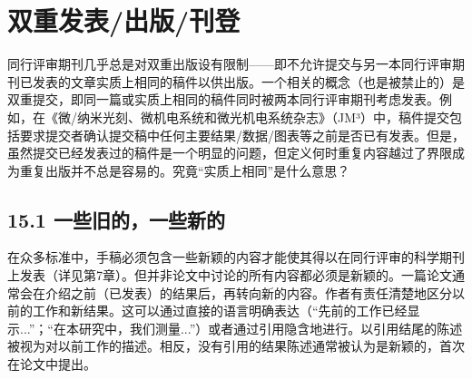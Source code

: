 \section*{双重发表/出版/刊登}
同行评审期刊几乎总是对双重出版设有限制——即不允许提交与另一本同行评审期刊已发表的文章实质上相同的稿件以供出版。一个相关的概念（也是被禁止的）是双重提交，即同一篇或实质上相同的稿件同时被两本同行评审期刊考虑发表。例如，在《微/纳米光刻、微机电系统和微光机电系统杂志》（JM³）中，稿件提交包括要求提交者确认提交稿中任何主要结果/数据/图表等之前是否已有发表。但是，虽然提交已经发表过的稿件是一个明显的问题，但定义何时重复内容越过了界限成为重复出版并不总是容易的。究竟“实质上相同”是什么意思？

\subsection*{15.1 一些旧的，一些新的}
在众多标准中，手稿必须包含一些新颖的内容才能使其得以在同行评审的科学期刊上发表（详见第7章）。但并非论文中讨论的所有内容都必须是新颖的。一篇论文通常会在介绍之前（已发表）的结果后，再转向新的内容。作者有责任清楚地区分以前的工作和新结果。这可以通过直接的语言明确表达（“先前的工作已经显示...”；“在本研究中，我们测量...”）或者通过引用隐含地进行。以引用结尾的陈述被视为对以前工作的描述。相反，没有引用的结果陈述通常被认为是新颖的，首次在论文中提出。

